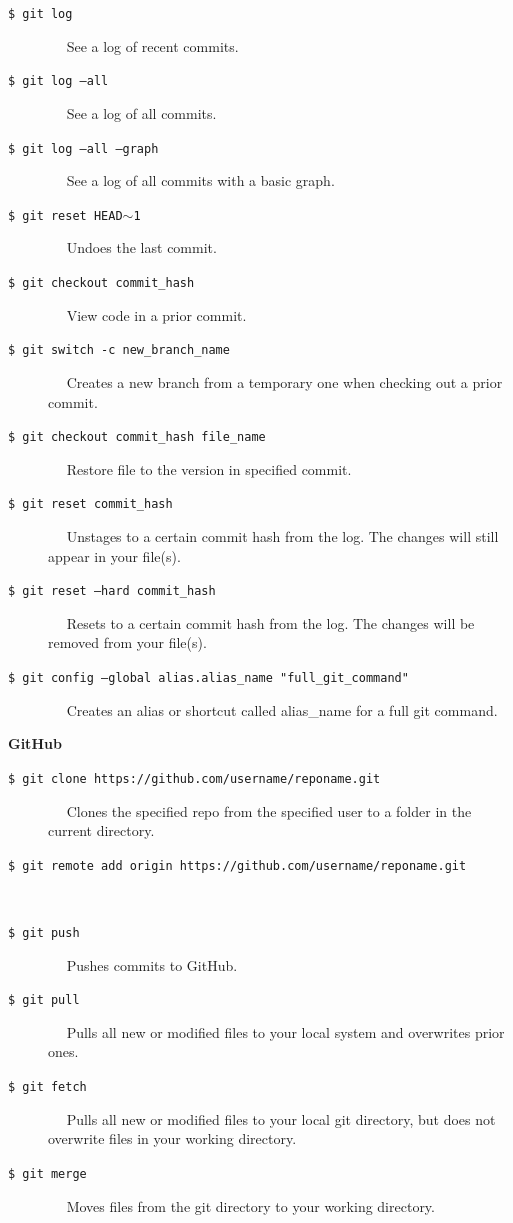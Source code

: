 \documentclass[11pt]{article}
\begin{document}
\begin{description}
	\item[\texttt{\$ git log}] $\quad$ See a log of recent commits.
	\item[\texttt{\$ git log --all}] $\quad$ See a log of all commits.
	\item[\texttt{\$ git log --all --graph}] $\quad$ See a log of all commits with a basic graph.
	\item[\texttt{\$ git reset HEAD$\sim$1}] $\quad$ Undoes the last commit.
	\item[\texttt{\$ git checkout commit\_hash}] $\quad$ View code in a prior commit.
	\item[\texttt{\$ git switch -c new\_branch\_name}] $\quad$ Creates a new branch from a temporary one when checking out a prior commit. 
	\item[\texttt{\$ git checkout commit\_hash file\_name}] $\quad$ Restore file to the version in specified commit.
	\item[\texttt{\$ git reset commit\_hash}] $\quad$ Unstages to a certain commit hash from the log. The changes will still appear in your file(s).
	\item[\texttt{\$ git reset --hard commit\_hash}] $\quad$ Resets to a certain commit hash from the log. The changes will be removed from your file(s).
	\item[\texttt{\$ git config --global alias.alias\_name "full\_git\_command"}] $\quad$ Creates an alias or shortcut called alias\_name for a full git command.
\end{description}

\newpage

\vspace{.1in}
\begin{tcolorbox}[width=1.03in, sharp corners=all, colback=white!95!black] %
	{\bf GitHub}
\end{tcolorbox}

\begin{description}
	\item[\texttt{\$ git clone https://github.com/username/reponame.git}] $\quad$ Clones the specified repo from the specified user to a folder in the current directory. 
	\item[\texttt{\$ git remote add origin https://github.com/username/reponame.git}] $\quad$
	\item[\texttt{\$ git push}] $\quad$ Pushes commits to GitHub.
	\item[\texttt{\$ git pull}] $\quad$ Pulls all new or modified files to your local system and overwrites prior ones.
	\item[\texttt{\$ git fetch}] $\quad$ Pulls all new or modified files to your local git directory, but does not overwrite files in your working directory.
	\item[\texttt{\$ git merge}] $\quad$ Moves files from the git directory to your working directory.
	
\end{description}
\end{document}
